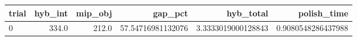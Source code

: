 \begin{tabular}{lrrrrr}
\hline
trial & hyb_int & mip_obj & gap_pct & hyb_total & polish_time \\ \hline
0 & 334.0 & 212.0 & 57.54716981132076 & 3.3333019000128843 & 0.9080548286437988 \\
\hline
\end{tabular}
